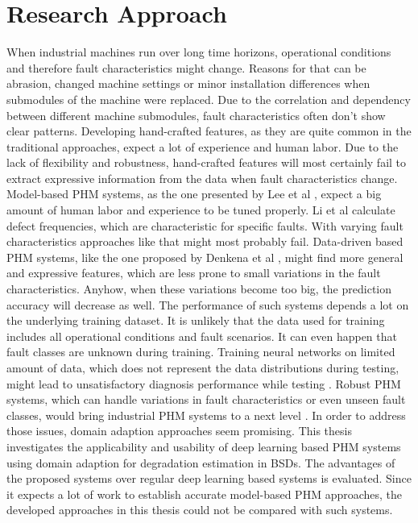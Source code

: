 \chapter{Research Approach}\label{chapter:research_approach}

When industrial machines run over long time horizons, operational conditions and therefore fault characteristics might change. Reasons for that can be abrasion, changed machine settings or minor installation differences when submodules of the machine were replaced. Due to the correlation and dependency between different machine submodules, fault characteristics often don't show clear patterns. Developing hand-crafted features, as they are quite common in the traditional approaches, expect a lot of experience and human labor. Due to the lack of flexibility and robustness, hand-crafted features will most certainly fail to extract expressive information from the data when fault characteristics change. Model-based PHM systems, as the one presented by Lee et al \cite{Lee2015}, expect a big amount of human labor and experience to be tuned properly. Li et al calculate defect frequencies, which are characteristic for specific faults. With varying fault characteristics approaches like that might most probably fail. Data-driven based PHM systems, like the one proposed by Denkena et al \cite{Denkena2021}, might find more general and expressive features, which are less prone to small variations in the fault characteristics. Anyhow, when these variations become too big, the prediction accuracy will decrease as well. The performance of such systems depends a lot on the underlying training dataset. It is unlikely that the data used for training includes all operational conditions and fault scenarios. It can even happen that fault classes are unknown during training. Training neural networks on limited amount of data, which does not represent the data distributions during testing, might lead to unsatisfactory diagnosis performance while testing \cite{AZAMFAR2020103932}. Robust PHM systems, which can handle variations in fault characteristics or even unseen fault classes, would bring industrial PHM systems to a next level \cite{Michau2017}. In order to address those issues, domain adaption approaches seem promising. This thesis investigates the applicability and usability of deep learning based PHM systems using domain adaption for degradation estimation in BSDs. The advantages of the proposed systems over regular deep learning based systems is evaluated. Since it expects a lot of work to establish accurate model-based PHM approaches, the developed approaches in this thesis could not be compared with such systems.

